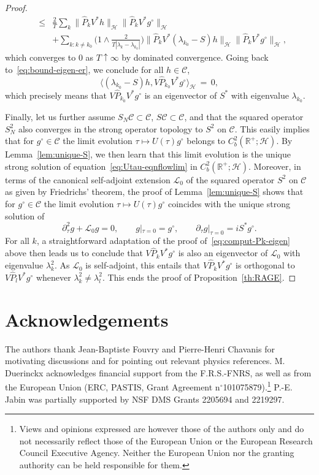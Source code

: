 \documentclass[a4paper,11pt,reqno,noindent]{amsart}
\theoremstyle{plain}
\numberwithin{equation}{section}
\newcommand{\R}{\mathbb R}
\newcommand{\Cc}{\mathcal C}
\newcommand{\Lc}{\mathcal L}
\newcommand{\Hc}{\mathcal H}
\newcommand{\3}{|\!|\!|}
\begin{document}
\begin{proof}
\begin{eqnarray*}
&\le&
\tfrac2T\sum_{k}\|\hat P_kV^*h\|_\Hc\|\hat P_kV^* g^\circ\|_\Hc\\
&&+\sum_{k:k\ne k_0}\big(1\wedge\tfrac2{T|\lambda_k-\lambda_{k_0}|}\big)\|\hat P_kV^*(\lambda_{k_0}-S)h\|_\Hc\|\hat P_kV^* g^\circ\|_\Hc,
\end{eqnarray*}
which converges to $0$ as $T\uparrow\infty$ by dominated convergence. Going back to~\eqref{eq:bound-eigen-er}, we conclude for all $h\in\Cc$,
\begin{equation}\label{eq:comput-Pk-eigen}
\big\langle (\lambda_{k_0}-S)h,V\hat P_{k_0}V^* g^\circ\big\rangle_\Hc\,=\,0,
\end{equation}
which precisely means that $V\hat P_{k_0}V^* g^\circ$ is an eigenvector of $S^*$ with eigenvalue $\lambda_{k_0}$. 

Finally, let us further assume $S_N\Cc\subset\Cc$, $S\Cc\subset\Cc$, and that the squared operator~$S_N^2$ also converges in the strong operator topology to $S^2$ on $\Cc$. This easily implies that for $g^\circ\in\Cc$ the limit evolution $\tau\mapsto U(\tau)g^\circ$ belongs to $C^2_b(\R^+;\Hc)$.
By Lemma~\ref{lem:unique-S}, we then learn that this limit evolution is the unique strong solution of equation~\eqref{eq:Utau-eqnflowlim} in $C^2_b(\R^+;\Hc)$.
Moreover, in terms of the canonical self-adjoint extension $\Lc_0$ of the squared operator $S^2$ on $\Cc$ as given by Friedrichs' theorem, the proof of Lemma~\ref{lem:unique-S} shows that for $g^\circ\in\Cc$ the limit evolution $\tau\mapsto U(\tau)g^\circ$ coincides with the unique strong solution of
\[\partial_\tau^2g+\Lc_0g=0,\qquad g|_{\tau=0}=g^\circ,\qquad \partial_\tau g|_{\tau=0}=iS^*g^\circ.\]
For all $k$, a straightforward adaptation of the proof of~\eqref{eq:comput-Pk-eigen} above then leads us to conclude that $V\hat P_kV^*g^\circ$ is also an eigenvector of $\Lc_0$ with eigenvalue $\lambda_k^2$. As $\Lc_0$ is self-adjoint, this entails that $V\hat P_kV^*g^\circ$ is orthogonal to $V\hat P_lV^*g^\circ$ whenever $\lambda_k^2\ne\lambda_l^2$. This ends the proof of Proposition~\ref{th:RAGE}.
\end{proof}

\section*{Acknowledgements}
The authors thank Jean-Baptiste Fouvry and Pierre-Henri Chavanis for motivating discussions and for pointing out relevant physics references.
M. Duerinckx acknowledges financial support from the F.R.S.-FNRS, as well as from the European Union (ERC, PASTIS, Grant Agreement n$^\circ$101075879).\footnote{{Views and opinions expressed are however those of the authors only and do not necessarily reflect those of the European Union or the European Research Council Executive Agency. Neither the European Union nor the granting authority can be held responsible for them.}} P.-E. Jabin was partially supported by NSF DMS Grants 2205694 and 2219297.
\end{document}
